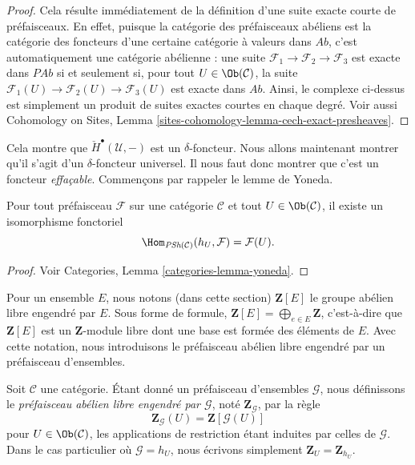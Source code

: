\begin{proof}
Cela r\'esulte imm\'ediatement de la d\'efinition d'une suite exacte courte de
pr\'efaisceaux. En effet, puisque la cat\'egorie des pr\'efaisceaux ab\'eliens est la cat\'egorie des
foncteurs d'une certaine cat\'egorie \`a valeurs dans $\textit{Ab}$, c'est automatiquement une
cat\'egorie ab\'elienne : une suite $\mathcal{F}_1\to \mathcal{F}_2\to \mathcal{F}_3$
est exacte dans $\textit{PAb}$ si et seulement si, pour tout
$U \in \Ob(\mathcal{C})$, la suite
$\mathcal{F}_1(U) \to \mathcal{F}_2(U) \to \mathcal{F}_3(U)$ est exacte dans
$\textit{Ab}$. Ainsi, le complexe ci-dessus est simplement un produit de suites exactes courtes
en chaque degr\'e. Voir aussi
Cohomology on Sites, Lemma \ref{sites-cohomology-lemma-cech-exact-presheaves}.
\end{proof}

\noindent
Cela montre que $\check{H}^\bullet(\mathcal{U}, -)$ est un $\delta$-foncteur.
Nous allons maintenant montrer qu'il s'agit d'un $\delta$-foncteur universel. Il nous faut donc
montrer que c'est un foncteur {\it effa\c{c}able}. Commen\c{c}ons par rappeler le
lemme de Yoneda.

\begin{lemma}
\label{lemma-yoneda-presheaf}
Pour tout pr\'efaisceau $\mathcal{F}$ sur une cat\'egorie $\mathcal{C}$
et tout $U \in \Ob(\mathcal{C})$, il existe un isomorphisme fonctoriel
$$
\Hom_{\textit{PSh}(\mathcal{C})}(h_U, \mathcal{F}) =
\mathcal{F}(U).
$$
\end{lemma}

\begin{proof}
Voir Categories, Lemma \ref{categories-lemma-yoneda}.
\end{proof}

\noindent
Pour un ensemble $E$, nous notons (dans cette section)
$\mathbf{Z}[E]$ le groupe ab\'elien libre engendr\'e par $E$. Sous forme de formule,
$\mathbf{Z}[E] = \bigoplus_{e \in E} \mathbf{Z}$, c'est-\`a-dire que $\mathbf{Z}[E]$ est
un $\mathbf{Z}$-module libre dont une base est form\'ee des \'el\'ements de $E$.
Avec cette notation, nous introduisons le pr\'efaisceau ab\'elien libre engendr\'e par un
pr\'efaisceau d'ensembles.

\begin{definition}
\label{definition-free-abelian-presheaf}
Soit $\mathcal{C}$ une cat\'egorie.
\'Etant donn\'e un pr\'efaisceau d'ensembles $\mathcal{G}$, nous d\'efinissons le
{\it pr\'efaisceau ab\'elien libre engendr\'e par $\mathcal{G}$},
not\'e $\mathbf{Z}_\mathcal{G}$, par la r\`egle
$$
\mathbf{Z}_\mathcal{G}(U)
=
\mathbf{Z}[\mathcal{G}(U)]
$$
pour $U \in \Ob(\mathcal{C})$,
les applications de restriction \'etant induites par celles de $\mathcal{G}$.
Dans le cas particulier o\`u $\mathcal{G} = h_U$, nous \'ecrivons simplement
$\mathbf{Z}_U = \mathbf{Z}_{h_U}$.
\end{definition}

